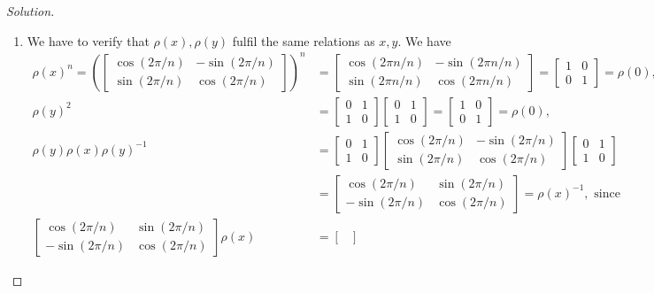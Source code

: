 \begin{proof}[Solution]
\begin{enumerate}[font=\normalfont,label=\textbf{(\alph*)}, wide]
\item We have to verify that $\rho(x), \rho(y)$ fulfil the same relations as $x, y$. We have
\[
\begin{aligned}
\rho(x)^n =
\left(
\begin{bmatrix}
\cos(2\pi/n) & -\sin(2\pi/n) \\
\sin(2\pi/n) & \cos(2\pi/n)
\end{bmatrix}
\right)^n &=
\begin{bmatrix}
\cos(2\pi n/n) & -\sin(2\pi n/n) \\
\sin(2\pi n/n) & \cos(2\pi n/n)
\end{bmatrix}
=
\begin{bmatrix}
1 & 0 \\
0 & 1
\end{bmatrix}
= \rho(0), \\
\rho(y)^2 &=
\begin{bmatrix}
0 & 1 \\
1 & 0
\end{bmatrix}
\begin{bmatrix}
0 & 1 \\
1 & 0
\end{bmatrix}
=
\begin{bmatrix}
1 & 0 \\
0 & 1
\end{bmatrix}
= \rho(0), \\
\rho(y)\rho(x)\rho(y)^{-1} &=
\begin{bmatrix}
0 & 1 \\
1 & 0
\end{bmatrix}
\begin{bmatrix}
\cos(2\pi/n) & -\sin(2\pi/n) \\
\sin(2\pi/n) & \cos(2\pi/n)
\end{bmatrix}
\begin{bmatrix}
0 & 1 \\
1 & 0
\end{bmatrix}
\\
&=
\begin{bmatrix}
  \cos(2\pi/n) & \sin(2\pi/n) \\
  -\sin(2\pi/n) & \cos(2\pi/n)
\end{bmatrix}
= \rho(x)^{-1}, \text{ since} \\
\begin{bmatrix}
  \cos(2\pi/n) & \sin(2\pi/n) \\
  -\sin(2\pi/n) & \cos(2\pi/n)
\end{bmatrix}
\rho(x) &=
\begin{bmatrix}

\end{bmatrix}
\end{aligned}\]
\end{enumerate}
\end{proof}
